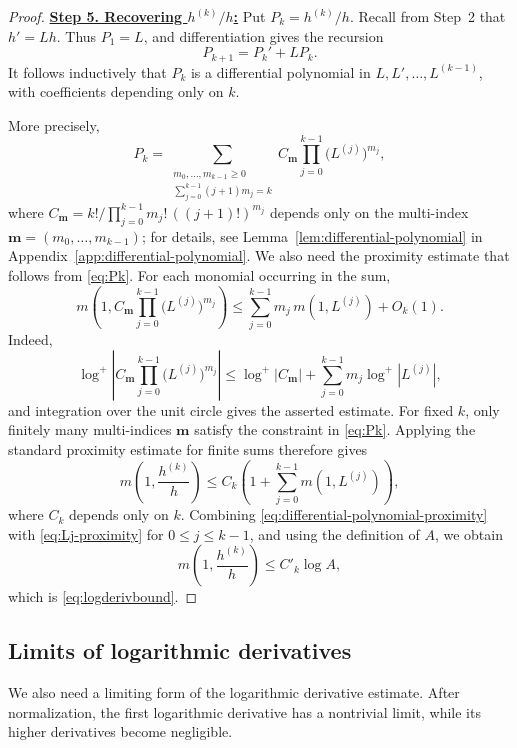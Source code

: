 \documentclass[12pt,letterpaper,reqno]{amsart}
\theoremstyle{definition}
\numberwithin{equation}{section}
\begin{document}
\begin{proof}
\medskip\noindent
\textbf{\underline{Step 5. Recovering \(h^{(k)}/h\):}}
Put
$
P_k={h^{(k)}}/h.
$
Recall from Step~2 that \(h'=Lh\). Thus \(P_1=L\), and differentiation gives the
recursion
$$
P_{k+1}
=
P_k'+LP_k.
$$
It follows inductively that \(P_k\) is a differential polynomial in
\(L,L',\ldots,L^{(k-1)}\), with coefficients depending only on \(k\).

More precisely, 
\begin{equation}\label{eq:Pk}
    P_k
=
\sum_{\substack{m_0,\ldots,m_{k-1}\ge0\\
\sum_{j=0}^{k-1}(j+1)m_j=k}}
C_{\mathbf m}
\prod_{j=0}^{k-1}
\bigl(L^{(j)}\bigr)^{m_j},
\end{equation}
where
$
C_{\mathbf m}
={k!}/
{\displaystyle\prod_{j=0}^{k-1}m_j!\,((j+1)!)^{m_j}}
$
depends only on the multi-index \(\mathbf m=(m_0,\ldots,m_{k-1})\); for details, see Lemma~\ref{lem:differential-polynomial} in Appendix~\ref{app:differential-polynomial}.
We also need the proximity estimate that follows from
\eqref{eq:Pk}. For each monomial occurring in the sum,
$$
m\!\left(
1,
C_{\mathbf m}
\prod_{j=0}^{k-1}
\bigl(L^{(j)}\bigr)^{m_j}
\right)
\le
\sum_{j=0}^{k-1}
m_j\,m(1,L^{(j)})
+O_k(1).
$$
Indeed,
$$
\log^+\left|
C_{\mathbf m}
\prod_{j=0}^{k-1}
\bigl(L^{(j)}\bigr)^{m_j}
\right|
\le
\log^+|C_{\mathbf m}|
+
\sum_{j=0}^{k-1}
m_j\log^+|L^{(j)}|,
$$
and integration over the unit circle gives the asserted estimate.
For fixed \(k\), only finitely many multi-indices
\(\mathbf m\) satisfy the constraint in \eqref{eq:Pk}.
Applying the standard proximity estimate for finite sums therefore gives
\begin{equation}\label{eq:differential-polynomial-proximity}
m\!\left(1,\frac{h^{(k)}}{h}\right)
\le
C_k\left(
1+\sum_{j=0}^{k-1}m(1,L^{(j)})
\right),
\end{equation}
where \(C_k\) depends only on \(k\).
Combining \eqref{eq:differential-polynomial-proximity} with
\eqref{eq:Lj-proximity} for \(0\le j\le k-1\), and using the definition of
\(A\), we obtain
\[
m\!\left(1,\frac{h^{(k)}}h\right)\le C'_k\log A,
\]
which is \eqref{eq:logderivbound}.
\end{proof}






\subsection{Limits of logarithmic derivatives}

We also need a limiting form of the logarithmic derivative estimate. After
normalization, the first logarithmic derivative has a nontrivial limit, while
its higher derivatives become negligible.
\end{document}
